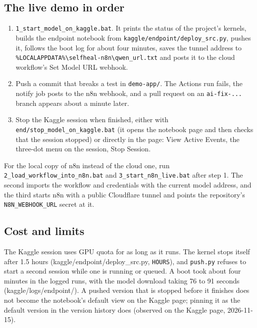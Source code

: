 \subsection{The live demo in order}

\begin{enumerate}[leftmargin=*, itemsep=2pt]
\item \texttt{1\_\allowbreak{}start\_\allowbreak{}model\_\allowbreak{}on\_\allowbreak{}kaggle.\allowbreak{}bat}. It prints the status of the project's kernels, builds the endpoint notebook from \texttt{kaggle/\allowbreak{}endpoint/\allowbreak{}deploy\_\allowbreak{}src.\allowbreak{}py}, pushes it, follows the boot log for about four minutes, saves the tunnel address to \texttt{\%LOCALAPPDATA\%\textbackslash{}selfheal-\allowbreak{}n8n\textbackslash{}qwen\_\allowbreak{}url.\allowbreak{}txt} and posts it to the cloud workflow's Set Model URL webhook.
\item Push a commit that breaks a test in \texttt{demo-\allowbreak{}app/\allowbreak{}}. The Actions run fails, the notify job posts to the n8n webhook, and a pull request on an \texttt{ai-\allowbreak{}fix-\allowbreak{}.\allowbreak{}.\allowbreak{}.\allowbreak{}} branch appears about a minute later.
\item Stop the Kaggle session when finished, either with \texttt{end/\allowbreak{}stop\_\allowbreak{}model\_\allowbreak{}on\_\allowbreak{}kaggle.\allowbreak{}bat} (it opens the notebook page and then checks that the session stopped) or directly in the page: View Active Events, the three-dot menu on the session, Stop Session.
\end{enumerate}

For the local copy of n8n instead of the cloud one, run \texttt{2\_\allowbreak{}load\_\allowbreak{}workflow\_\allowbreak{}into\_\allowbreak{}n8n.\allowbreak{}bat} and \texttt{3\_\allowbreak{}start\_\allowbreak{}n8n\_\allowbreak{}live.\allowbreak{}bat} after step 1. The second imports the workflow and credentials with the current model address, and the third starts n8n with a public Cloudflare tunnel and points the repository's \texttt{N8N\_\allowbreak{}WEBHOOK\_\allowbreak{}URL} secret at it.

\subsection{Cost and limits}

The Kaggle session uses GPU quota for as long as it runs. The kernel stops itself after 1.5 hours (kaggle/\allowbreak{}endpoint/\allowbreak{}deploy\_\allowbreak{}src.py, \texttt{HOURS}), and \texttt{push.\allowbreak{}py} refuses to start a second session while one is running or queued. A boot took about four minutes in the logged runs, with the model download taking 76 to 91 seconds (kaggle/\allowbreak{}logs/\allowbreak{}endpoint/\allowbreak{}). A pushed version that is stopped before it finishes does not become the notebook's default view on the Kaggle page; pinning it as the default version in the version history does (observed on the Kaggle page, 2026-11-15).

